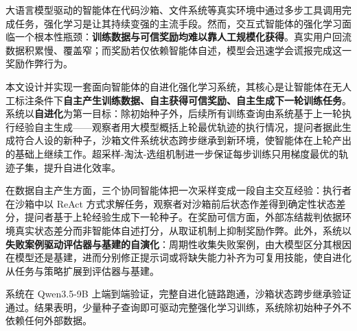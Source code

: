 
\begin{abstractzh}

大语言模型驱动的智能体在代码沙箱、文件系统等真实环境中通过多步工具调用完成任务，强化学习是让其持续变强的主流手段。然而，交互式智能体的强化学习面临一个根本性瓶颈：\textbf{训练数据与可信奖励均难以靠人工规模化获得}。真实用户回流数据积累慢、覆盖窄；而奖励若仅依赖智能体自述，模型会迅速学会谎报完成这一奖励作弊行为。

本文设计并实现一套面向智能体的自进化强化学习系统，其核心是让智能体在无人工标注条件下\textbf{自主产生训练数据、自主获得可信奖励、自主生成下一轮训练任务}。系统以\textbf{自进化}为第一目标：除初始种子外，后续所有训练查询由系统基于上一轮执行经验自主生成——观察者用大模型概括上轮最优轨迹的执行情况，提问者据此生成符合人设的新种子，沙箱文件系统状态跨步继承到新环境，使智能体在上轮产出的基础上继续工作。超采样-淘汰-选组机制进一步保证每步训练只用梯度最优的轨迹子集，提升自进化效率。

在数据自主产生方面，三个协同智能体把一次采样变成一段自主交互经验：执行者在沙箱中以 ReAct 方式求解任务，观察者对沙箱前后状态作差得到确定性状态差分，提问者基于上轮经验生成下一轮种子。在奖励可信方面，外部冻结裁判依据环境真实状态差分而非智能体自述打分，从取证机制上抑制奖励作弊。此外，系统以\textbf{失败案例驱动评估器与基建的自演化}：周期性收集失败案例，由大模型区分其根因在模型还是基建，进而分别修正提示词或将缺失能力补齐为可复用技能，使自进化从任务与策略扩展到评估器与基建。

系统在 Qwen3.5-9B 上端到端验证，完整自进化链路跑通，沙箱状态跨步继承验证通过。结果表明，少量种子查询即可驱动完整强化学习训练，系统除初始种子外不依赖任何外部数据。

\end{abstractzh}
